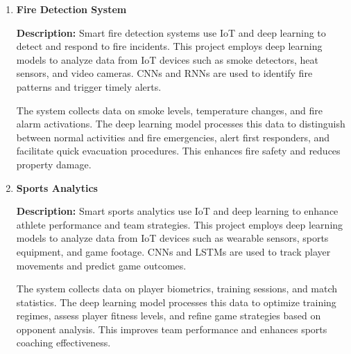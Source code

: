 \documentclass{article}
\begin{document}
\begin{enumerate}[label=\textbf{\arabic*.}, leftmargin=*]


\vspace{24pt} %
\item \textbf{Fire Detection System}

\textbf{Description:}
Smart fire detection systems use IoT and deep learning to detect and respond to fire incidents. This project employs deep learning models to analyze data from IoT devices such as smoke detectors, heat sensors, and video cameras. CNNs and RNNs are used to identify fire patterns and trigger timely alerts.

The system collects data on smoke levels, temperature changes, and fire alarm activations. The deep learning model processes this data to distinguish between normal activities and fire emergencies, alert first responders, and facilitate quick evacuation procedures. This enhances fire safety and reduces property damage.



\vspace{24pt} %
\item \textbf{Sports Analytics}

\textbf{Description:}
Smart sports analytics use IoT and deep learning to enhance athlete performance and team strategies. This project employs deep learning models to analyze data from IoT devices such as wearable sensors, sports equipment, and game footage. CNNs and LSTMs are used to track player movements and predict game outcomes.

The system collects data on player biometrics, training sessions, and match statistics. The deep learning model processes this data to optimize training regimes, assess player fitness levels, and refine game strategies based on opponent analysis. This improves team performance and enhances sports coaching effectiveness.



\end{enumerate}
\end{document}
